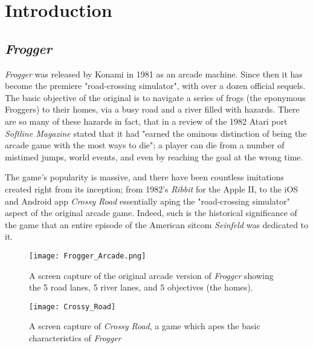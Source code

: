 \documentclass[12pt, a4paper]{report}
\begin{document}
\maketitle

\tableofcontents
\pagebreak

\section{Introduction}
\subsection{\textit{Frogger}}
\textit{Frogger} was released by Konami in 1981 as an arcade machine.
Since then it has become the premiere "road-crossing simulator", with over a dozen official sequels.
The basic objective of the original is to navigate a series of frogs (the eponymous Froggers) to their homes, via a busy road and a river filled with hazards.
There are so many of these hazards in fact, that in a review of the 1982 Atari port \textit{Softline Magazine} stated that it had "earned the ominous distinction of being the arcade game with the most ways to die"\cite{softline}; a player can die from a number of mistimed jumps, world events, and even by reaching the goal at the wrong time.
\par
The game's popularity is massive, and there have been countless imitations created right from its inception; from 1982's \textit{Ribbit} for the Apple II, to the iOS and Android app \textit{Crossy Road} essentially aping the "road-crossing simulator" aspect of the original arcade game.
Indeed, such is the historical significance of the game that an entire episode of the American sitcom \textit{Seinfeld} was dedicated to it\cite{seinfeld}.

\begin{figure}[ht]
  \centering
  \caption{A screen capture of the original arcade version of \textit{Frogger} showing the 5 road lanes, 5 river lanes, and 5 objectives (the homes).}
  \texttt{[image: Frogger\_Arcade.png]}
\end{figure}
\begin{figure}[ht]
  \centering
  \caption{A screen capture of \textit{Crossy Road}, a game which apes the basic characteristics of \textit{Frogger}}
  \texttt{[image: Crossy\_Road]}
\end{figure}
\end{document}
